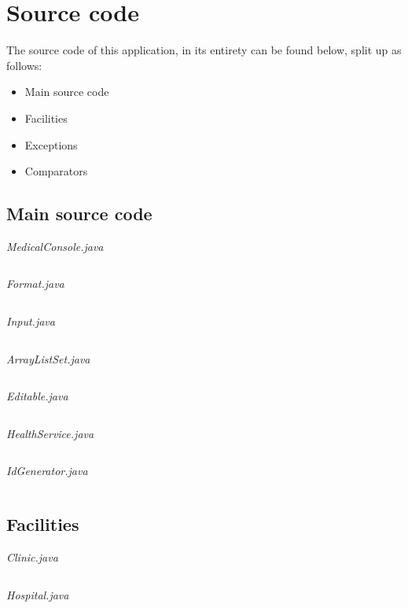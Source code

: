 \documentclass{article}
\begin{document}
	\section{Source code}\label{sec:code} %
	The source code of this application, in its entirety can be found below, split up as follows: 
	\begin{itemize}
		\item Main source code 
		\item Facilities
		\item Exceptions
		\item Comparators
	\end{itemize}

	\subsection{Main source code}\label{sub:main_source_code} %
	\textit{MedicalConsole.java}
	\inputminted{java}{src/main/java/com/yvesstraten/medicalconsole/MedicalConsole.java}

	\pagebreak

	\textit{Format.java}
	\inputminted{java}{src/main/java/com/yvesstraten/medicalconsole/Format.java}

	\textit{Input.java}
	\inputminted{java}{src/main/java/com/yvesstraten/medicalconsole/Input.java}

	\textit{ArrayListSet.java}
	\inputminted{java}{./src/main/java/com/yvesstraten/medicalconsole/ArrayListSet.java}

	\textit{Editable.java}
	\inputminted{java}{src/main/java/com/yvesstraten/medicalconsole/Editable.java}

	\pagebreak

	\textit{HealthService.java}
	\inputminted{java}{src/main/java/com/yvesstraten/medicalconsole/HealthService.java}

	\textit{IdGenerator.java}
	\inputminted{java}{src/main/java/com/yvesstraten/medicalconsole/IdGenerator.java}

	\subsection{Facilities}\label{sub:facilities} %
	\textit{Clinic.java}
	\inputminted{java}{src/main/java/com/yvesstraten/medicalconsole/facilities/Clinic.java}

	\pagebreak

	\textit{Hospital.java}
	\inputminted{java}{src/main/java/com/yvesstraten/medicalconsole/facilities/Hospital.java}
\end{document}
